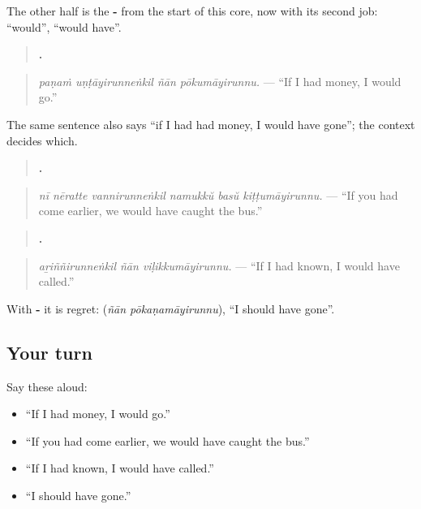 \begin{grammarlens}[title={Grammar Lens: -\ml{ഉമായിരുന്നു}, would}]
The other half is the \textbf{-} from the start of this core, now with its second job: \textquotedblleft{}would\textquotedblright{}, \textquotedblleft{}would have\textquotedblright{}.

\begin{quote}
\textbf{   .}
\end{quote}

\begin{quote}
\emph{paṇaṁ uṇṭāyirunneṅkil ñān pōkumāyirunnu.} — \textquotedblleft{}If I had money, I would go.\textquotedblright{}
\end{quote}

The same sentence also says \textquotedblleft{}if I had had money, I would have gone\textquotedblright{}; the context decides which.

\begin{quote}
\textbf{     .}
\end{quote}

\begin{quote}
\emph{nī nēratte vannirunneṅkil namukkŭ basŭ kiṭṭumāyirunnu.} — \textquotedblleft{}If you had come earlier, we would have caught the bus.\textquotedblright{}
\end{quote}

\begin{quote}
\textbf{  .}
\end{quote}

\begin{quote}
\emph{aṟiññirunneṅkil ñān viḷikkumāyirunnu.} — \textquotedblleft{}If I had known, I would have called.\textquotedblright{}
\end{quote}

With \textbf{-} it is regret: \textbf{ } (\emph{ñān pōkaṇamāyirunnu}), \textquotedblleft{}I should have gone\textquotedblright{}.
\end{grammarlens}

\subsection*{Your turn}
Say these aloud:

\begin{itemize}
\raggedright
  \item \textquotedblleft{}If I had money, I would go.\textquotedblright{}
  \item \textquotedblleft{}If you had come earlier, we would have caught the bus.\textquotedblright{}
  \item \textquotedblleft{}If I had known, I would have called.\textquotedblright{}
  \item \textquotedblleft{}I should have gone.\textquotedblright{}
\end{itemize}

